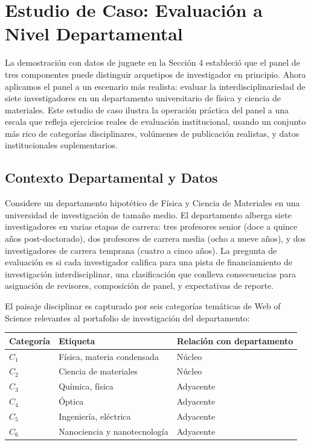 \documentclass[
]{article}
\begin{document}
\hypertarget{estudio-de-caso-evaluaciuxf3n-a-nivel-departamental}{%
\section{Estudio de Caso: Evaluación a Nivel
Departamental}\label{estudio-de-caso-evaluaciuxf3n-a-nivel-departamental}}

La demostración con datos de juguete en la Sección 4 estableció que el
panel de tres componentes puede distinguir arquetipos de investigador en
principio. Ahora aplicamos el panel a un escenario más realista: evaluar
la interdisciplinariedad de siete investigadores en un departamento
universitario de física y ciencia de materiales. Este estudio de caso
ilustra la operación práctica del panel a una escala que refleja
ejercicios reales de evaluación institucional, usando un conjunto más
rico de categorías disciplinares, volúmenes de publicación realistas, y
datos institucionales suplementarios.

\hypertarget{contexto-departamental-y-datos}{%
\subsection{Contexto Departamental y
Datos}\label{contexto-departamental-y-datos}}

Considere un departamento hipotético de Física y Ciencia de Materiales
en una universidad de investigación de tamaño medio. El departamento
alberga siete investigadores en varias etapas de carrera: tres
profesores senior (doce a quince años post-doctorado), dos profesores de
carrera media (ocho a nueve años), y dos investigadores de carrera
temprana (cuatro a cinco años). La pregunta de evaluación es si cada
investigador califica para una pista de financiamiento de investigación
interdisciplinar, una clasificación que conlleva consecuencias para
asignación de revisores, composición de panel, y expectativas de
reporte.

El paisaje disciplinar es capturado por seis categorías temáticas de Web
of Science relevantes al portafolio de investigación del departamento:

\begin{longtable}[]{@{}lll@{}}
\toprule
Categoría & Etiqueta & Relación con departamento \\
\midrule
\endhead
\(C_1\) & Física, materia condensada & Núcleo \\
\(C_2\) & Ciencia de materiales & Núcleo \\
\(C_3\) & Química, física & Adyacente \\
\(C_4\) & Óptica & Adyacente \\
\(C_5\) & Ingeniería, eléctrica & Adyacente \\
\(C_6\) & Nanociencia y nanotecnología & Adyacente \\
\bottomrule
\end{longtable}
\end{document}
